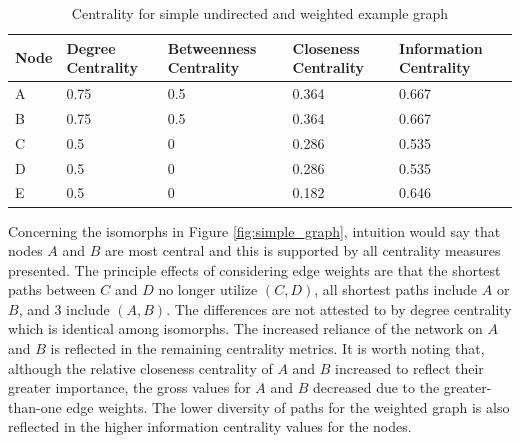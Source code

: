\begin{table}[H]
	\centering
	\caption{Centrality for simple undirected and weighted example graph}
	\label{tab:weighted_centrality}
	\begin{tabular}{|C{.2\linewidth}|C{.2\linewidth}|C{.2\linewidth}|C{.2\linewidth}|C{.2\linewidth}|}
		\hline Node & Degree Centrality & Betweenness Centrality & Closeness Centrality & Information Centrality \\
		\hline A & 0.75 & 0.5 & 0.364 & 0.667 \\
		\hline B & 0.75 & 0.5 & 0.364 & 0.667 \\
		\hline C & 0.5 & 0 & 0.286 & 0.535 \\
		\hline D & 0.5 & 0 & 0.286 & 0.535 \\
		\hline E & 0.5 & 0 & 0.182 & 0.646 \\
		\hline
	\end{tabular}
\end{table}

Concerning the isomorphs in Figure \ref{fig:simple_graph}, intuition would say that nodes $A$ and $B$ are most central and this is supported by all centrality measures presented. The principle effects of considering edge weights are that the shortest paths between $C$ and $D$ no longer utilize $(C, D)$, all shortest paths include $A$ or $B$, and 3 include $(A, B)$. The differences are not attested to by degree centrality which is identical among isomorphs. The increased reliance of the network on $A$ and $B$ is reflected in the remaining centrality metrics. It is worth noting that, although the relative closeness centrality of $A$ and $B$ increased to reflect their greater importance, the gross values for $A$ and $B$ decreased due to the greater-than-one edge weights. The lower diversity of paths for the weighted graph is also reflected in the higher information centrality values for the nodes.

